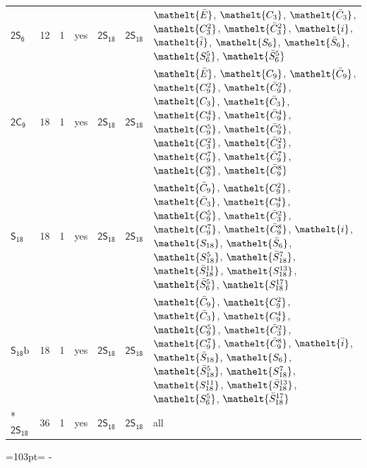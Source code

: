 \documentclass[10pt,a4paper]{article}
\newcommand{\needspace}[1]{\par\penalty-100\begingroup\dimen0=#1\relax\dimen2=\pagegoal
  \advance\dimen2-\pagetotal\ifdim\dimen0>\dimen2\relax\ifdim\dimen2>0pt\vfil\break\fi\fi
  \endgroup}
\numberwithin{equation}{section}
\newcommand{\eltfont}[1]{{\let\sigma\eltsigma\mathelt{#1}}}
\newcommand{\grp}[1]{\mathsf{#1}}
\newcommand{\cls}[1]{\eltfont{#1}}
\newcommand{\barred}[1]{\bar{#1}}
\newcommand{\secondclass}{\mathrm{b}}
\newlength{\fillwidth}\newlength{\cellwidth}\newlength{\colwidth}
\begin{document}
{\begin{longtable}{@{}lrrlll>{\RaggedRight\arraybackslash}p{\fillwidth}@{}}
\href{2S6.pdf}{$\grp{2S_{6}}$} & 12 & 1 & yes & \href{2S18.pdf}{$\grp{2S_{18}}$} & \href{2S18.pdf}{$\grp{2S_{18}}$} & $\cls{\barred{E}}$, $\cls{C_{3}}$, $\cls{\barred{C}_{3}}$, $\cls{C_{3}^{2}}$, $\cls{\barred{C}_{3}^{2}}$, $\cls{i}$, $\cls{\barred{i}}$, $\cls{S_{6}}$, $\cls{\barred{S}_{6}}$, $\cls{S_{6}^{5}}$, $\cls{\barred{S}_{6}^{5}}$\\
\href{2C9.pdf}{$\grp{2C_{9}}$} & 18 & 1 & yes & \href{2S18.pdf}{$\grp{2S_{18}}$} & \href{2S18.pdf}{$\grp{2S_{18}}$} & $\cls{\barred{E}}$, $\cls{C_{9}}$, $\cls{\barred{C}_{9}}$, $\cls{C_{9}^{2}}$, $\cls{\barred{C}_{9}^{2}}$, $\cls{C_{3}}$, $\cls{\barred{C}_{3}}$, $\cls{C_{9}^{4}}$, $\cls{\barred{C}_{9}^{4}}$, $\cls{C_{9}^{5}}$, $\cls{\barred{C}_{9}^{5}}$, $\cls{C_{3}^{2}}$, $\cls{\barred{C}_{3}^{2}}$, $\cls{C_{9}^{7}}$, $\cls{\barred{C}_{9}^{7}}$, $\cls{C_{9}^{8}}$, $\cls{\barred{C}_{9}^{8}}$\\
\href{S18.pdf}{$\grp{S_{18}}$} & 18 & 1 & yes & \href{2S18.pdf}{$\grp{2S_{18}}$} & \href{2S18.pdf}{$\grp{2S_{18}}$} & $\cls{\barred{C}_{9}}$, $\cls{C_{9}^{2}}$, $\cls{\barred{C}_{3}}$, $\cls{C_{9}^{4}}$, $\cls{C_{9}^{5}}$, $\cls{\barred{C}_{3}^{2}}$, $\cls{C_{9}^{7}}$, $\cls{\barred{C}_{9}^{8}}$, $\cls{i}$, $\cls{S_{18}}$, $\cls{\barred{S}_{6}}$, $\cls{S_{18}^{5}}$, $\cls{\barred{S}_{18}^{7}}$, $\cls{\barred{S}_{18}^{11}}$, $\cls{S_{18}^{13}}$, $\cls{\barred{S}_{6}^{5}}$, $\cls{S_{18}^{17}}$\\
\href{S18b.pdf}{$\grp{S_{18}}\secondclass$} & 18 & 1 & yes & \href{2S18.pdf}{$\grp{2S_{18}}$} & \href{2S18.pdf}{$\grp{2S_{18}}$} & $\cls{\barred{C}_{9}}$, $\cls{C_{9}^{2}}$, $\cls{\barred{C}_{3}}$, $\cls{C_{9}^{4}}$, $\cls{C_{9}^{5}}$, $\cls{\barred{C}_{3}^{2}}$, $\cls{C_{9}^{7}}$, $\cls{\barred{C}_{9}^{8}}$, $\cls{\barred{i}}$, $\cls{\barred{S}_{18}}$, $\cls{S_{6}}$, $\cls{\barred{S}_{18}^{5}}$, $\cls{S_{18}^{7}}$, $\cls{S_{18}^{11}}$, $\cls{\barred{S}_{18}^{13}}$, $\cls{S_{6}^{5}}$, $\cls{\barred{S}_{18}^{17}}$\\*
\href{2S18.pdf}{$\grp{2S_{18}}$} & 36 & 1 & yes & \href{2S18.pdf}{$\grp{2S_{18}}$} & \href{2S18.pdf}{$\grp{2S_{18}}$} & all\\
\bottomrule\end{longtable}}
\needspace{103pt}
\end{document}
